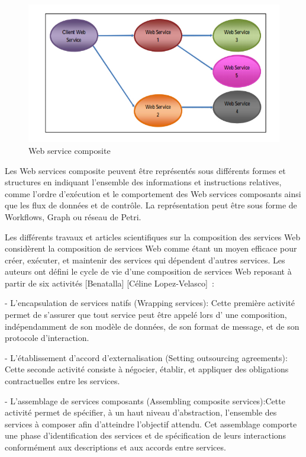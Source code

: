 \begin{figure}[H]
\begin{center}
\includegraphics[width=1\linewidth]{images/CWS.jpg}
\end{center}
\caption{Web service composite}
\label{fig:1}
\end{figure}



Les Web services composite peuvent être représentés sous différents formes et structures en indiquant l’ensemble des informations et instructions relatives, comme l’ordre d’exécution et le comportement des Web services composants ainsi que les flux de données  et de contrôle.
La représentation peut être sous forme de Workflows, Graph ou réseau de Petri.



Les différents travaux et articles scientifiques sur la composition des services Web 
considèrent la composition de services Web comme étant un moyen efficace 
pour créer, exécuter, et maintenir des services qui dépendent d’autres services. Les auteurs ont défini le cycle de vie d’une composition de services Web reposant à partir de six activités [Benatalla] [Céline Lopez-Velasco] : 

- L’encapsulation de services natifs (Wrapping services): Cette première activité permet de  s’assurer que tout service peut être appelé lors d’ une composition, indépendamment de son  modèle de données, de son format de message, et de son protocole d’interaction. 


- L’établissement d’accord d’externalisation (Setting outsourcing agreements): Cette seconde activité consiste à négocier, établir, et appliquer des obligations contractuelles entre les services.


- L’assemblage de services composants (Assembling composite services):Cette activité permet  de spécifier, à un haut niveau d’abstraction, l’ensemble des services à composer afin d’atteindre  l’objectif attendu. Cet assemblage comporte une phase d’identification des services et de spécification de leurs interactions conformément aux descriptions et aux accords entre services. 


